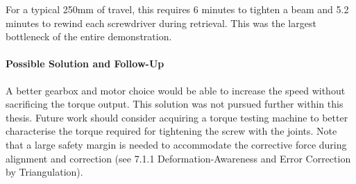 For a typical 250mm of travel, this requires 6 minutes to tighten a beam and 5.2 minutes to rewind each screwdriver during retrieval. This was the largest bottleneck of the entire demonstration.

\paragraph{Possible Solution and Follow-Up}
A better gearbox and motor choice would be able to increase the speed without sacrificing the torque output. This solution was not pursued further within this thesis. Future work should consider acquiring a torque testing machine to better characterise the torque required for tightening the screw with the joints. Note that a large safety margin is needed to accommodate the corrective force during alignment and correction (see 7.1.1 Deformation-Awareness and Error Correction by Triangulation). 

